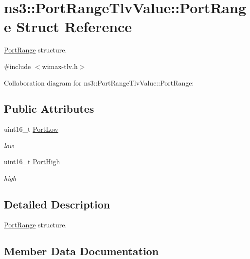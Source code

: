 \hypertarget{structns3_1_1PortRangeTlvValue_1_1PortRange}{}\section{ns3\+:\+:Port\+Range\+Tlv\+Value\+:\+:Port\+Range Struct Reference}
\label{structns3_1_1PortRangeTlvValue_1_1PortRange}


\hyperlink{structns3_1_1PortRangeTlvValue_1_1PortRange}{Port\+Range} structure.  




{\ttfamily \#include $<$wimax-\/tlv.\+h$>$}



Collaboration diagram for ns3\+:\+:Port\+Range\+Tlv\+Value\+:\+:Port\+Range\+:
\subsection*{Public Attributes}
\begin{DoxyCompactItemize}
\item 
uint16\+\_\+t \hyperlink{structns3_1_1PortRangeTlvValue_1_1PortRange_af687aec99ac76c56c7d2c9bf789e39aa}{Port\+Low}
\begin{DoxyCompactList}\small\item\em low \end{DoxyCompactList}\item 
uint16\+\_\+t \hyperlink{structns3_1_1PortRangeTlvValue_1_1PortRange_af368bfb1f7b7b72e0a9d939421c5446a}{Port\+High}
\begin{DoxyCompactList}\small\item\em high \end{DoxyCompactList}\end{DoxyCompactItemize}


\subsection{Detailed Description}
\hyperlink{structns3_1_1PortRangeTlvValue_1_1PortRange}{Port\+Range} structure. 

\subsection{Member Data Documentation}
